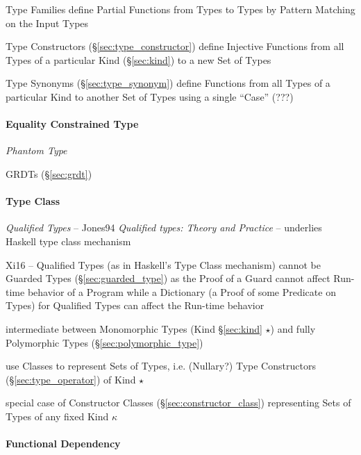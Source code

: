 \fist Type Families define Partial Functions from Types to Types by
Pattern Matching on the Input Types

\fist Type Constructors (\S\ref{sec:type_constructor}) define
Injective Functions from all Types of a particular Kind
(\S\ref{sec:kind}) to a new Set of Types

\fist Type Synonyms (\S\ref{sec:type_synonym}) define Functions from
all Types of a particular Kind to another Set of Types using a single
``Case'' (???) %



\paragraph{Equality Constrained Type}
\label{sec:equality_constrained}\hfill

\emph{Phantom Type}

\fist GRDTs (\S\ref{sec:grdt})



\paragraph{Type Class}\label{sec:type_class}\hfill

\emph{Qualified Types} -- \cite{jones94} Jones94 \emph{Qualified
  types: Theory and Practice} -- underlies Haskell type class
mechanism

Xi16 -- Qualified Types (as in Haskell's Type Class mechanism) cannot
be Guarded Types (\S\ref{sec:guarded_type}) as the Proof of a Guard
cannot affect Run-time behavior of a Program while a Dictionary (a
Proof of some Predicate on Types) for Qualified Types can affect the
Run-time behavior

\cite{jones95}

intermediate between Monomorphic Types (Kind \S\ref{sec:kind} $\star$)
and fully Polymorphic Types (\S\ref{sec:polymorphic_type})

use Classes to represent Sets of Types, i.e. (Nullary?) Type
Constructors (\S\ref{sec:type_operator}) of Kind $\star$

special case of Constructor Classes (\S\ref{sec:constructor_class})
representing Sets of Types of any fixed Kind $\kappa$



\paragraph{Functional Dependency}\label{sec:functional_dependency}\hfill

